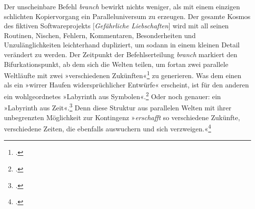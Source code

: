 \documentclass[a4paper,12pt]{article}
\newcommand{\anf}[1]{»#1«}
\begin{document}
Der unscheinbare Befehl \emph{branch} bewirkt nichts weniger, als mit einem einzigen schlichten Kopiervorgang ein Paralleluniversum zu erzeugen. Der gesamte Kosmos des fiktiven Softwareprojekts [\emph{Gefährliche Liebschaften}] wird mit all seinen Routinen, Nischen, Fehlern, Kommentaren, Besonderheiten und Unzulänglichkeiten leichterhand dupliziert, um sodann in einem kleinen Detail verändert zu werden. Der Zeitpunkt der Befehlserteilung \emph{branch} markiert den Bifurkationspunkt, ab dem sich die Welten teilen, um fortan zwei parallele Weltläufte mit zwei \anf{verschiedenen Zukünften}\footcite[169]{borges:1941} zu generieren. Was dem einen als ein \anf{wirrer Haufen widersprüchlicher Entwürfe} erscheint, ist für den anderen ein wohlgeordnetes \anf{Labyrinth aus Symbolen}.\footcite[168]{borges:1941} Oder noch genauer: ein \anf{Labyrinth aus Zeit}.\footcite[168]{borges:1941} Denn diese Struktur aus parallelen Welten mit ihrer unbegrenzten Möglichkeit zur Kontingenz \anf{\emph{erschafft} so verschiedene Zukünfte, verschiedene Zeiten, die ebenfalls auswuchern und sich verzweigen.}\footcite[170]{borges:1941} 
\end{document}
